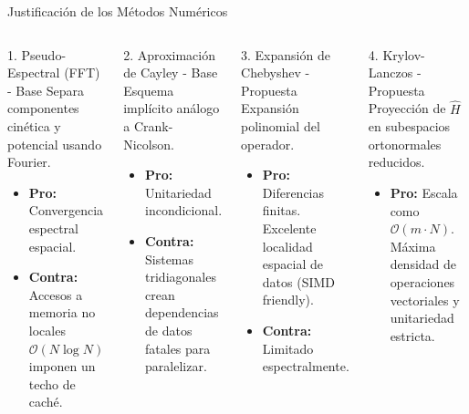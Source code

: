 \documentclass[aspectratio=169,10pt,xcolor=table]{beamer}
\begin{document}
\begin{frame}{Justificación de los Métodos Numéricos}
  \begin{columns}[t]
      \begin{block}{1. Pseudo-Espectral (FFT) - Base}
        Separa componentes cinética y potencial usando Fourier.
        \begin{itemize}
          \item \textbf{Pro:} Convergencia espectral espacial.
          \item \textbf{Contra:} Accesos a memoria no locales $\mathcal{O}(N \log N)$ imponen un techo de caché.
        \end{itemize}
      \end{block}
      
      \begin{block}{2. Aproximación de Cayley - Base}
        Esquema implícito análogo a Crank-Nicolson.
        \begin{itemize}
          \item \textbf{Pro:} Unitariedad incondicional.
          \item \textbf{Contra:} Sistemas tridiagonales crean dependencias de datos fatales para paralelizar.
        \end{itemize}
      \end{block}
      
      \begin{exampleblock}{3. Expansión de Chebyshev - Propuesta}
        Expansión polinomial del operador.
        \begin{itemize}
          \item \textbf{Pro:} Diferencias finitas. Excelente localidad espacial de datos (SIMD friendly).
          \item \textbf{Contra:} Limitado espectralmente.
        \end{itemize}
      \end{exampleblock}
      
      \begin{exampleblock}{4. Krylov-Lanczos - Propuesta}
        Proyección de $\hat{H}$ en subespacios ortonormales reducidos.
        \begin{itemize}
          \item \textbf{Pro:} Escala como $\mathcal{O}(m \cdot N)$. Máxima densidad de operaciones vectoriales y unitariedad estricta.
        \end{itemize}
      \end{exampleblock}
  \end{columns}
\end{frame}
\end{document}
